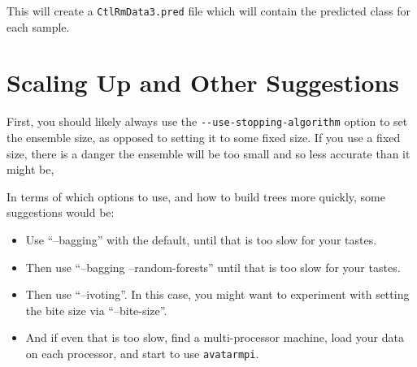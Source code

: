 \documentclass{article}
\begin{document}
This will create a \verb=CtlRmData3.pred= file which will contain the predicted class for each
sample.

\section{Scaling Up and Other Suggestions}

First, you should likely always use the \verb=--use-stopping-algorithm= option to set the ensemble
size, as opposed to setting it to some fixed size. If you use a fixed size, there is a danger the
ensemble will be too small and so less accurate than it might be,

In terms of which options to use, and how to build trees more quickly, some suggestions would be:
\begin{itemize}
\item Use ``--bagging'' with the default, until that is too slow for your tastes.
\item Then use ``--bagging --random-forests'' until that is too slow for your tastes.
\item Then use ``--ivoting''. In this case, you might want to experiment with setting the bite size
  via ``--bite-size''.
\item And if even that is too slow, find a multi-processor machine, load your data on each
  processor, and start to use \verb=avatarmpi=.
\end{itemize}
\end{document}
